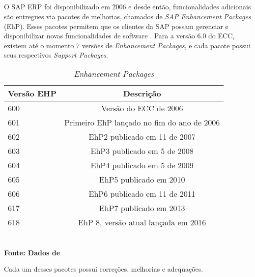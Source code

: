 \subsection{}

O SAP ERP foi disponibilizado em 2006 e desde então, funcionalidades adicionais são entregues via pacotes de melhorias, chamados de \textit{SAP Enhancement Packages} (EhP). Esses pacotes permitem que os clientes da SAP possam gerenciar e disponibilizar novas funcionalidades de software \cite{SAPERPEHP}.
Para a versão 6.0 do ECC, existem até o momento 7 versões de \textit{Enhancement Packages}, e cada pacote possui seus respectivos \textit{Support Packages}.

\begin{table}[htb]
	\centering
	\caption{\hspace{0.1cm} \textit{Enhancement Packages }}
	\vspace{-0.3cm} %
	\label{tab:tabela1}
	\begin{tabular}{l|c}
		\hline
		\textbf{Versão EHP}	& \textbf{Descrição} \\
		\hline
		600	& Versão do ECC de 2006                               \\
		601	& Primeiro EhP lançado no fim do ano de 2006          \\
		602	& EhP2 publicado em 11 de 2007                        \\
		603	& EhP3 publicado em 5 de 2008                         \\
		604	& EhP4 publicado em 5 de 2009                         \\
		605	& EhP5 publicado em 2010                              \\
		606	& EhP6 publicado em 11 de 2011                        \\
		617	& EhP7 publicado em 2013                              \\
		618	& EhP 8, versão atual lançada em 2016                 \\
		\hline
	\end{tabular}
	\vspace{.1cm}  %
	\small
	{\footnotesize\\ \textbf{Fonte: Dados de \cite{sappam}}}
\end{table}

Cada um desses pacotes possui correções, melhorias e adequações.

